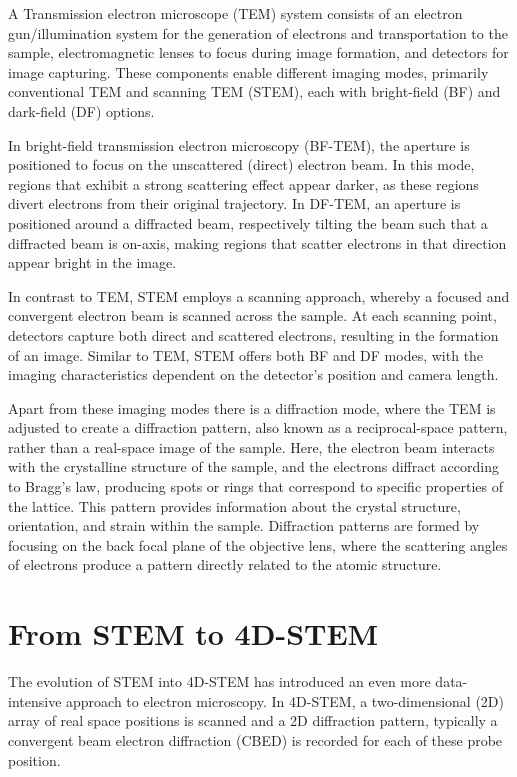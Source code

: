 A Transmission electron microscope (TEM) system consists of an electron gun/illumination system for the generation of electrons and transportation to the sample, electromagnetic lenses to focus during image formation, and detectors for image capturing. 
These components enable different imaging modes, primarily conventional TEM and scanning TEM (STEM), each with bright-field (BF) and dark-field (DF) options.
\par In bright-field transmission electron microscopy (BF-TEM), the aperture is positioned to focus on the unscattered (direct) electron beam. 
In this mode, regions that exhibit a strong scattering effect appear darker, as these regions divert electrons from their original trajectory.
In DF-TEM, an aperture is positioned around a diffracted beam, respectively tilting the beam such that a diffracted beam is on-axis, making regions that scatter electrons in that direction appear bright in the image.
\par In contrast to TEM, STEM employs a scanning approach, whereby a focused and convergent electron beam is scanned across the sample.
At each scanning point, detectors capture both direct and scattered electrons, resulting in the formation of an image.
Similar to TEM, STEM offers both BF and DF modes, with the imaging characteristics dependent on the detector's position and camera length.


Apart from these imaging modes there is a diffraction mode, where the TEM is adjusted to create a diffraction pattern, also known as a reciprocal-space pattern, rather than a real-space image of the sample. 
Here, the electron beam interacts with the crystalline structure of the sample, and the electrons diffract according to Bragg’s law, producing spots or rings that correspond to specific properties of the lattice.
This pattern provides information about the crystal structure, orientation, and strain within the sample. 
Diffraction patterns are formed by focusing on the back focal plane of the objective lens, where the scattering angles of electrons produce a pattern directly related to the atomic structure.




\section{From STEM to 4D-STEM}

The evolution of STEM into 4D-STEM has introduced an even more data-intensive approach to electron microscopy. 
In 4D-STEM, a two-dimensional (2D) array of real space positions is scanned and a 2D diffraction pattern, typically a convergent beam electron diffraction (CBED) is recorded for each of these probe position.

